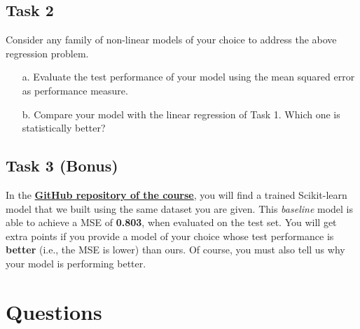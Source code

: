 \documentclass[11pt]{scrartcl}
\begin{document}
\subsection*{Task 2}
Consider any family of non-linear models of your choice to address the above regression problem.
\begin{itemize}
	\item [a.] Evaluate the test performance of your model using the mean squared error as performance measure. 
	\item [b.] Compare your model with the linear regression of Task 1. Which one is {statistically} better?
\end{itemize}

\subsection*{Task 3 (Bonus)}
In the \href{https://github.com/GiorgiaAuroraAdorni/ML-bachelor-course-assignments-sp23}{\textbf{GitHub repository of the course}}, you will find a trained Scikit-learn model that we built using the same dataset you are given. 
This \textit{baseline} model is able to achieve a MSE of \textbf{0.803}, when evaluated on the test set. 
You will get extra points if you provide a model of your choice whose test performance is \textbf{better} (i.e., the MSE is lower) than ours. Of course, you must also tell us why your model is performing better.

\section*{Questions}
\end{document}
